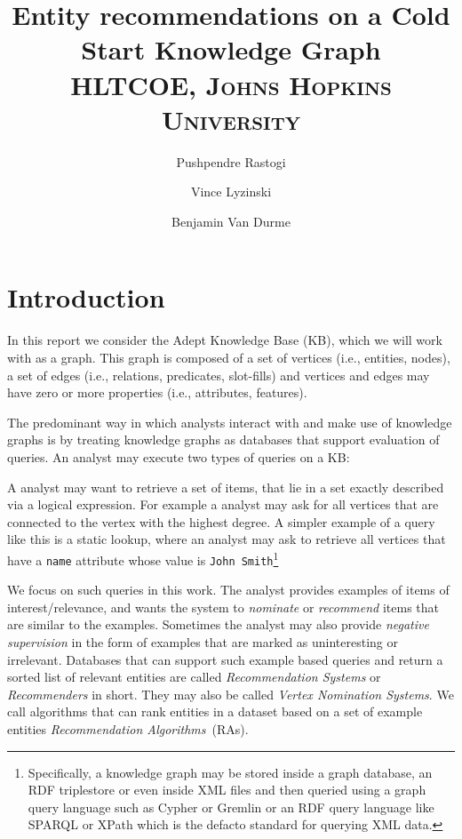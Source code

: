 \documentclass[paper=a4,fontsize=11pt]{scrartcl}
\title{
  \vspace{-1in}
  {\normalfont\huge Entity recommendations on a Cold Start Knowledge Graph}\\
  {\normalfont\normalsize\textsc{HLTCOE, Johns Hopkins University}}\\
}
\author{{\normalfont\normalsize Pushpendre Rastogi}
  \and
  {\normalfont\normalsize Vince Lyzinski}
  \and
  {\normalfont\normalsize Benjamin Van Durme}\\
}
\date{}
\newcommand{\ie}{i.e.,\xspace}
\numberwithin{equation}{section}    %
\numberwithin{figure}{section}      %
\numberwithin{table}{section}       %
\begin{document}
\maketitle
\section{Introduction}
\label{sec:introduction}
In this report we consider the Adept Knowledge Base (KB), which we
will work with as a graph. This graph is composed of a set of
vertices (\ie entities, nodes), a set of edges (\ie relations,
predicates, slot-fills) and vertices and edges may have zero or more
properties (\ie attributes, features).

The predominant way in which analysts interact with and make use of knowledge
graphs is by treating knowledge graphs as databases that support evaluation
of queries. An analyst may execute two types of queries on a KB:
\begin{description}[leftmargin=*]
\item[Logical Expression Based Queries] A analyst may want to retrieve a set of items,
  that lie in a set exactly described via a logical expression. For example a analyst
may ask for all vertices that are connected to the vertex with the highest
degree. A simpler example of a query like this is a static lookup, where an
analyst may ask to retrieve all vertices that have a \texttt{name} attribute
whose value is \texttt{John Smith}\footnote
{Specifically, a knowledge graph may be stored inside a graph database,
an RDF {triplestore} or even inside XML files and then queried using a graph
query language such as Cypher or Gremlin or an RDF query language like SPARQL
or XPath which is the defacto standard for querying XML data.}
\item[Example Based Queries] We focus on such queries in this work.
  The analyst provides {examples} of items of
  interest/relevance, and wants the system to \textit{nominate} or \textit{recommend}
  items that are similar to the examples. Sometimes the analyst may also
  provide \textit{negative supervision} in the form of examples that are marked
  as uninteresting or irrelevant. Databases that can support such
  example based queries and return a sorted list of relevant entities are called
  \textit{Recommendation Systems} or \textit{Recommenders} in short. They may
  also be called \textit{Vertex Nomination Systems}. We call algorithms
that can rank entities in a dataset based on a set of example entities
\textit{Recommendation Algorithms}~(RAs).
\end{description}
\end{document}
